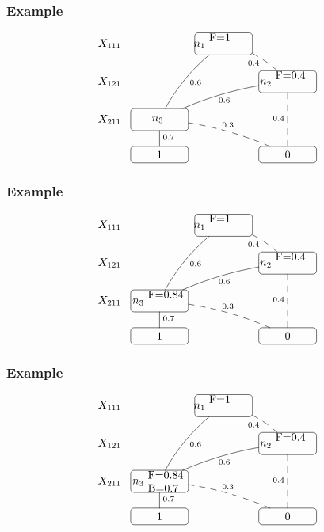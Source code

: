 \documentclass[trans,aspectratio=1610]{beamer}
\begin{document}
\begin{frame}
 \frametitle{Example}
   \begin{scriptsize}
$$\xymatrix@R=5mm@C=2mm
{ X_{111} & &*=<52pt,20pt>[F-:<3pt>]{n_1\ \parbox{40pt}{F=1\\
}}
\ar@/_/@{-}[ldd]^{0.6} \ar@/^/@{--}[dr]_{0.4}\\ 
X_{121}  & & &*=<52pt,20pt>[F-:<3pt>]{n_2\ \parbox{36pt}{F=0.4\\}} 
\ar@/_/@{-}[dll]^{0.6}\ar@{--}[dd] _{0.4}
\\
X_{211}& *=<52pt,20pt>[F-:<3pt>]{n_3\ \parbox{35pt}{}}
\ar@{-}[d]^{0.7} \ar@/^/@{--}[drr]^{0.3}  \\
&*=<52pt,15pt>[F-:<3pt>]{1} &&*=<52pt,15pt>[F-:<3pt>]{0}}
$$
\end{scriptsize}
\end{frame}
\begin{frame}
 \frametitle{Example}
   \begin{scriptsize}
$$\xymatrix@R=5mm@C=2mm
{ X_{111} & &*=<52pt,20pt>[F-:<3pt>]{n_1\ \parbox{40pt}{F=1\\
}}
\ar@/_/@{-}[ldd]^{0.6} \ar@/^/@{--}[dr]_{0.4}\\ 
X_{121}  & & &*=<52pt,20pt>[F-:<3pt>]{n_2\ \parbox{36pt}{F=0.4\\}} 
\ar@/_/@{-}[dll]^{0.6}\ar@{--}[dd] _{0.4}
\\
X_{211}& *=<52pt,20pt>[F-:<3pt>]{n_3\ \parbox{35pt}{F=0.84\\}}
\ar@{-}[d]^{0.7} \ar@/^/@{--}[drr]^{0.3}  \\
&*=<52pt,15pt>[F-:<3pt>]{1} &&*=<52pt,15pt>[F-:<3pt>]{0}}
$$
\end{scriptsize}
\end{frame}


\begin{frame}
 \frametitle{Example}
   \begin{scriptsize}
$$\xymatrix@R=5mm@C=2mm
{ X_{111} & &*=<52pt,20pt>[F-:<3pt>]{n_1\ \parbox{40pt}{F=1\\
}}
\ar@/_/@{-}[ldd]^{0.6} \ar@/^/@{--}[dr]_{0.4}\\ 
X_{121}  & & &*=<52pt,20pt>[F-:<3pt>]{n_2\ \parbox{36pt}{F=0.4\\}} 
\ar@/_/@{-}[dll]^{0.6}\ar@{--}[dd] _{0.4}
\\
X_{211}& *=<52pt,20pt>[F-:<3pt>]{n_3\ \parbox{35pt}{F=0.84\\B=0.7}}
\ar@{-}[d]^{0.7} \ar@/^/@{--}[drr]^{0.3}  \\
&*=<52pt,15pt>[F-:<3pt>]{1} &&*=<52pt,15pt>[F-:<3pt>]{0}}
$$
\end{scriptsize}
\end{frame}
\end{document}
